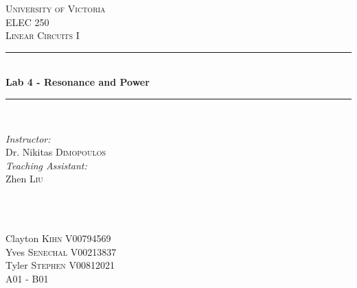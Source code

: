 \documentclass[12pt]{article}
\newcommand{\HRule}{\rule{\linewidth}{0.5mm}}
\begin{document}

\begin{titlepage}

\center
 
\textsc{\LARGE University of Victoria}\\[1cm] 	%
\textsc{\Large ELEC 250}\\[0.5cm] 			%
\textsc{\large Linear Circuits I}\\[0.5cm] 		%


\HRule \\[0.4cm]
{ \huge \bfseries Lab 4 - Resonance and Power}\\[0.2cm] %
\HRule \\[1.5cm]
 
 
\begin{minipage}{0.7\textwidth}
\begin{flushleft} 

\large\emph{Instructor:} \\
Dr. Nikitas \textsc{Dimopoulos} \\
\vspace{12 pt}
\emph{Teaching Assistant:} \\
Zhen \textsc{Liu}

\end{flushleft}
\end{minipage}
~
\begin{minipage}{0.1\textwidth}
\begin{flushright} \large
\vspace{12 pt}
\end{flushright}
\end{minipage}\\[2cm]


\Large Clayton \textsc{Kihn}
\large V00794569	\\
\Large Yves \textsc{Senechal}
\large V00213837	\\
\Large Tyler \textsc{Stephen}
\large V00812021	\\
A01 - B01\\[1.5cm] 



\end{titlepage}
\end{document}
